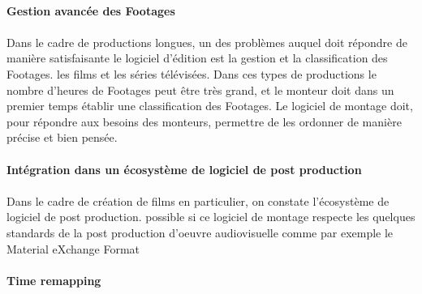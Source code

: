 \paragraph{Gestion avancée des Footages}

\paragraph{}

Dans le cadre de productions longues, un des problèmes auquel doit
répondre de manière satisfaisante le logiciel d'édition est la gestion
et la classification des Footages. %
les films et les séries télévisées.  Dans ces types de productions le
nombre d'heures de Footages peut être très grand, et le monteur doit
dans un premier temps établir une classification des Footages. Le
logiciel de montage doit, pour répondre aux besoins des monteurs,
permettre de les ordonner de manière précise et bien pensée.

\paragraph{Intégration dans un écosystème de logiciel de post
production}

\paragraph{}

Dans le cadre de création de films en particulier, on constate %
l'écosystème de logiciel de post production. %
possible si ce logiciel de montage respecte les quelques standards de
la post production d'oeuvre audiovisuelle comme par exemple le Material
eXchange Format  

\paragraph{Time remapping}

\paragraph{ }

